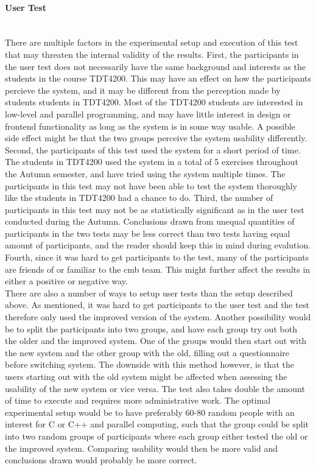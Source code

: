 \paragraph*{User Test} \hfill \\
There are multiple factors in the experimental setup and execution of this test that may threaten the internal validity of the results. First, the participants in the user test does not necessarily have the same background and interests as the students in the course TDT4200. This may have an effect on how the participants percieve the system, and it may be different from the perception made by students students in TDT4200. Most of the TDT4200 students are interested in low-level and parallel programming, and may have little interest in design or frontend functionality as long as the system is in some way usable. A possible side effect might be that the two groups perceive the system usability differently. \\

Second, the participants of this test used the system for a short period of time. The students in TDT4200 used the system in a total of 5 exercises throughout the Autumn semester, and have tried using the system multiple times. The participants in this test may not have been able to test the system thoroughly like the students in TDT4200 had a chance to do. Third, the number of participants in this test may not be as statistically significant as in the user test conducted during the Autumn. Conclusions drawn from unequal quantities of participants in the two tests may be less correct than two tests having equal amount of participants, and the reader should keep this in mind during evalution. Fourth, since it was hard to get participants to the test, many of the participants are friends of or familiar to the \gls{cmb} team. This might further affect the results in either a positive or negative way. \\

There are also a number of ways to setup user tests than the setup described above. As mentioned, it was hard to get participants to the user test and the test therefore only used the improved version of the system. Another possibility would be to split the participants into two groups, and have each group try out both the older and the improved system. One of the groups would then start out with the new system and the other group with the old, filling out a questionnaire before switching system. The downside with this method however, is that the users starting out with the old system might be affected when assessing the usability of the new system or vice versa. The test also takes double the amount of time to execute and requires more administrative work. The optimal experimental setup would be to have preferably 60-80 random people with an interest for C or C++ and parallel computing, such that the group could be split into two random groups of participants where each group either tested the old or the improved system. Comparing usability would then be more valid and conclusions drawn would probably be more correct.

